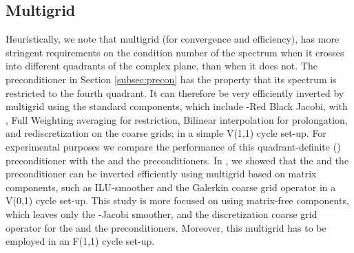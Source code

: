 \documentclass[mathpazo]{cicp}
\theoremstyle{definition}
\numberwithin{equation}{section}
\begin{document}
\subsection{Multigrid}
\label{subsec:mg}
Heuristically, we note that multigrid (for convergence and efficiency), has more stringent requirements on 
the condition number of the spectrum when it crosses into different quadrants of the complex plane, than when 
it does not. The preconditioner in Section \ref{subsec:precon} has the property that its spectrum is 
restricted to the fourth quadrant. It can therefore be very efficiently inverted by multigrid using the standard 
components, which include -Red Black Jacobi, with , Full Weighting averaging for restriction, 
Bilinear interpolation for prolongation, and rediscretization on the coarse grids; in a simple V(1,1) cycle set-up.
 For experimental purposes we compare the performance of this quadrant-definite () preconditioner with the  and 
the  preconditioners.
 In \cite{reps2009}, we showed that the  and the  preconditioner can be inverted efficiently using multigrid based on matrix components, such as ILU-smoother and the Galerkin coarse grid operator in a V(0,1) cycle set-up. This study is more focused on using matrix-free components, which leaves only the -Jacobi smoother, and the discretization coarse grid operator for the  and the  preconditioners. Moreover, this multigrid has to be employed in an F(1,1) cycle set-up. 
\end{document}
